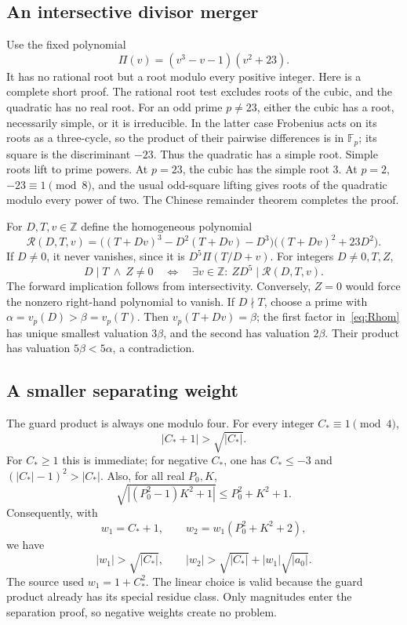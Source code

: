 \documentclass[11pt]{article}
\theoremstyle{definition}\newtheorem{definition}[theorem]{Definition}
\newcommand{\Z}{\mathbb Z}\newcommand{\N}{\mathbb N}\newcommand{\Q}{\mathbb Q}
\begin{document}
\subsection{An intersective divisor merger}
Use the fixed polynomial
\[
 \Pi(v)=(v^3-v-1)(v^2+23).
\]
It has no rational root but a root modulo every positive integer. Here is a complete short proof. The rational root test excludes roots of the cubic, and the quadratic has no real root. For an odd prime $p\ne23$, either the cubic has a root, necessarily simple, or it is irreducible. In the latter case Frobenius acts on its roots as a three-cycle, so the product of their pairwise differences is in $\mathbb F_p$; its square is the discriminant $-23$. Thus the quadratic has a simple root. Simple roots lift to prime powers. At $p=23$, the cubic has the simple root $3$. At $p=2$, $-23\equiv1\pmod8$, and the usual odd-square lifting gives roots of the quadratic modulo every power of two. The Chinese remainder theorem completes the proof.

For $D,T,v\in\Z$ define the homogeneous polynomial
\begin{equation}\label{eq:Rhom}
 \mathscr R(D,T,v)=
 \bigl((T+Dv)^3-D^2(T+Dv)-D^3\bigr)
 \bigl((T+Dv)^2+23D^2\bigr).
\end{equation}
If $D\ne0$, it never vanishes, since it is $D^5\Pi(T/D+v)$.
For integers $D\ne0,T,Z$,
\begin{equation}\label{eq:merge}
 D\mid T\ \land\ Z\ne0
 \quad\Longleftrightarrow\quad
 \exists v\in\Z:\ ZD^5\mid\mathscr R(D,T,v).
\end{equation}
The forward implication follows from intersectivity. Conversely, $Z=0$ would force the nonzero right-hand polynomial to vanish. If $D\nmid T$, choose a prime with $\alpha=v_p(D)>\beta=v_p(T)$. Then $v_p(T+Dv)=\beta$; the first factor in~\eqref{eq:Rhom} has unique smallest valuation $3\beta$, and the second has valuation $2\beta$. Their product has valuation $5\beta<5\alpha$, a contradiction.

\subsection{A smaller separating weight}
The guard product is always one modulo four. For every integer $C_*\equiv1\pmod4$,
\begin{equation}\label{eq:smallweight}
 |C_*+1|>\sqrt{|C_*|}.
\end{equation}
For $C_*\ge1$ this is immediate; for negative $C_*$, one has $C_*\le-3$ and $(|C_*|-1)^2>|C_*|$.
Also, for all real $P_0,K$,
\[
 \sqrt{|(P_0^2-1)K^2+1|}\le P_0^2+K^2+1.
\]
Consequently, with
\begin{equation}\label{eq:weights}
 w_1=C_*+1,\qquad w_2=w_1(P_0^2+K^2+2),
\end{equation}
we have
\[
 |w_1|>\sqrt{|C_*|},\qquad
 |w_2|>\sqrt{|C_*|}+|w_1|\sqrt{|a_0|}.
\]
The source used $w_1=1+C_*^2$. The linear choice is valid because the guard product already has its special residue class. Only magnitudes enter the separation proof, so negative weights create no problem.
\end{document}
